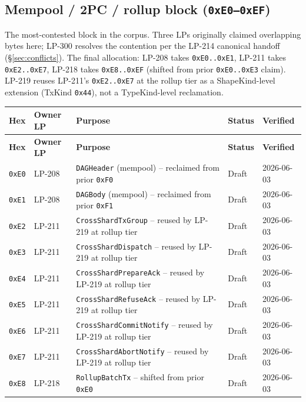 \subsection{Mempool / 2PC / rollup block (\texttt{0xE0--0xEF})}

The most-contested block in the corpus. Three LPs originally claimed
overlapping bytes here; LP-300 resolves the contention per the
LP-214 canonical handoff (\S\ref{sec:conflicts}). The final
allocation: LP-208 takes \texttt{0xE0..0xE1}, LP-211 takes
\texttt{0xE2..0xE7}, LP-218 takes \texttt{0xE8..0xEF} (shifted from
prior \texttt{0xE0..0xE3} claim). LP-219 reuses LP-211's
\texttt{0xE2..0xE7} at the rollup tier as a ShapeKind-level
extension (TxKind \texttt{0x44}), not a TypeKind-level reclamation.

\begin{longtable}{@{}p{1.9cm}p{1.7cm}p{6.4cm}p{1.4cm}p{1.6cm}@{}}
\toprule
\textbf{Hex} & \textbf{Owner LP} & \textbf{Purpose} & \textbf{Status} & \textbf{Verified} \\
\midrule
\endfirsthead
\toprule
\textbf{Hex} & \textbf{Owner LP} & \textbf{Purpose} & \textbf{Status} & \textbf{Verified} \\
\midrule
\endhead
\texttt{0xE0} & LP-208 & \texttt{DAGHeader} (mempool) -- reclaimed from prior \texttt{0xF0} & Draft & 2026-06-03 \\
\texttt{0xE1} & LP-208 & \texttt{DAGBody} (mempool) -- reclaimed from prior \texttt{0xF1} & Draft & 2026-06-03 \\
\texttt{0xE2} & LP-211 & \texttt{CrossShardTxGroup} -- reused by LP-219 at rollup tier & Draft & 2026-06-03 \\
\texttt{0xE3} & LP-211 & \texttt{CrossShardDispatch} -- reused by LP-219 at rollup tier & Draft & 2026-06-03 \\
\texttt{0xE4} & LP-211 & \texttt{CrossShardPrepareAck} -- reused by LP-219 at rollup tier & Draft & 2026-06-03 \\
\texttt{0xE5} & LP-211 & \texttt{CrossShardRefuseAck} -- reused by LP-219 at rollup tier & Draft & 2026-06-03 \\
\texttt{0xE6} & LP-211 & \texttt{CrossShardCommitNotify} -- reused by LP-219 at rollup tier & Draft & 2026-06-03 \\
\texttt{0xE7} & LP-211 & \texttt{CrossShardAbortNotify} -- reused by LP-219 at rollup tier & Draft & 2026-06-03 \\
\texttt{0xE8} & LP-218 & \texttt{RollupBatchTx} -- shifted from prior \texttt{0xE0} & Draft & 2026-06-03 \\

\end{longtable}
